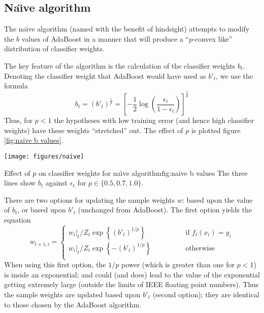 \subsection{Na\"{\i}ve algorithm}

The na\"{\i}ve algorithm (named with the benefit of hindsight) attempts to
modify the $b$ values of AdaBoost in a manner that will produce a
``$p$-convex like'' distribution of classifier weights.

The key feature of the algorithm is the calculation of the classifier
weights $b_t$.  Denoting the classifier weight that AdaBoost would have
used as $b'_t$, we use the formula
%
\begin{equation}
b_t = (b'_t)^{\frac{1}{p}} = \left[ - \frac{1}{2} \log \left
( \frac{\epsilon_t}{1 - \epsilon_t} \right) \right]^\frac{1}{p}
\end{equation}
%
Thus, for $p < 1$ the hypotheses with low training error (and hence
high classifier weights) have these weights ``stretched'' out.  The
effect of $p$ is plotted figure \ref{fig:naive b values}.

\begin{linefigure}
\begin{center}
\texttt{[image: figures/naive]}
\end{center}
\begin{capt}{Effect of $p$ on classifier weights for na\"{\i}ve
algorithm}{fig:naive b values} 
The three lines show $b_t$ against $\epsilon_t$ for $p \in \{ 0.5,
0.7, 1.0 \}$.
\end{capt}
\end{linefigure}

There are two options for updating the sample weights $w$: based upon
the value of $b_t$, or based upon $b'_t$ (unchanged from AdaBoost).
The first option yields the equation
%
\begin{equation}
w_{t+1,i} = \left\{
\begin{array}{cl}
	w_i|_t / Z_t \exp \left\{ (b'_t)^{1/p} \right\} & \qquad \qquad \mbox{if
	$f_t(x_i) = y_i$} \\
	w_i|_t / Z_t \exp \left\{ -(b'_t)^{1/p} \right\} 	& \qquad \qquad
	\mbox{otherwise} \\
\end{array} \right.
\end{equation}
%
When using this first option, the $1/p$ power (which is
greater than one for $p < 1$) is inside an exponential; and could
(and does) lead to the value of the exponential getting extremely
large (outside the limits of IEEE floating point numbers).  Thus the
sample weights are updated based upon $b'_t$ (second option); they are
identical to those chosen by the AdaBoost algorithm.

